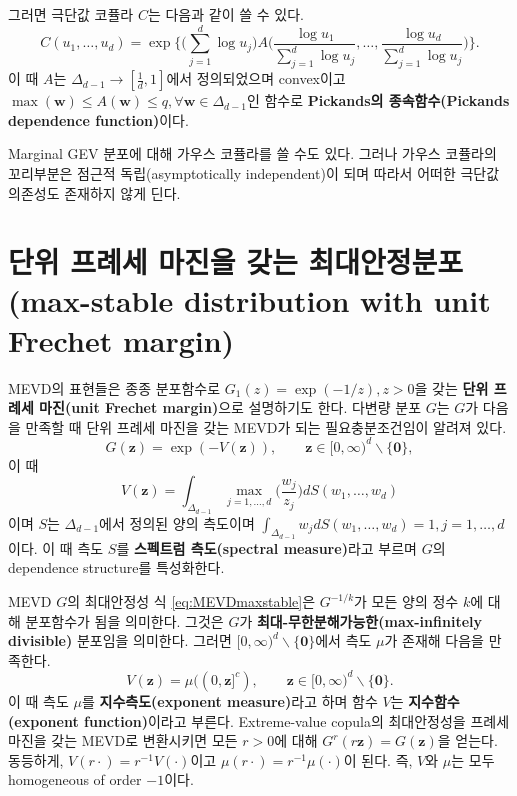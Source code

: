 \documentclass[b5paper,]{scrbook}
\theoremstyle{plain}
\theoremstyle{definition}
\numberwithin{equation}{section}
\begin{document}
그러면 극단값 코퓰라 \(C\)는 다음과 같이 쓸 수 있다.
\[C(u_{1},\ldots, u_{d}) = \exp{\Big\{ \Big( \sum_{j=1}^{d}\log u_{j} \Big)  A \Big( \frac{\log u_{1}}{\sum_{j=1}^{d}\log u_{j}},\ldots,  \frac{\log u_{d}}{\sum_{j=1}^{d}\log u_{j}} \Big) \Big\}}.\]
이 때 \(A\)는 \(\Delta_{d-1}\rightarrow [\frac{1}{d},1]\)에서 정의되었으며 convex이고 \(\max(\mathbf{w})\leq A(\mathbf{w}) \leq q, \forall \mathbf{w} \in \Delta_{d-1}\)인 함수로 \textbf{Pickands의 종속함수(Pickands dependence function)}이다.

Marginal GEV 분포에 대해 가우스 코퓰라를 쓸 수도 있다. 그러나 가우스 코퓰라의 꼬리부분은 점근적 독립(asymptotically independent)이 되며 따라서 어떠한 극단값 의존성도 존재하지 않게 딘다.

\hypertarget{----max-stable-distribution-with-unit-frechet-margin}{%
\section{단위 프례세 마진을 갖는 최대안정분포(max-stable distribution with unit Frechet margin)}\label{----max-stable-distribution-with-unit-frechet-margin}}

MEVD의 표현들은 종종 분포함수로 \(G_{1}(z) = \exp(-1/z), z>0\)을 갖는 \textbf{단위 프례세 마진(unit Frechet margin)}으로 설명하기도 한다. 다변량 분포 \(G\)는 \(G\)가 다음을 만족할 때 단위 프례세 마진을 갖는 MEVD가 되는 필요충분조건임이 알려져 있다.
\[G(\mathbf{z})=\exp(-V(\mathbf{z})), \qquad{\mathbf{z}\in[0,\infty)^{d}\backslash \{\mathbf{0}\}},\]
이 때
\[V(\mathbf{z})=\int_{\Delta_{d-1}}\max_{j=1,\ldots,d}\Big(\frac{w_{j}}{z_{j}}\Big) dS(w_{1},\ldots, w_{d})\]
이며 \(S\)는 \(\Delta_{d-1}\)에서 정의된 양의 측도이며 \(\int_{\Delta_{d-1}}w_{j}dS(w_{1},\ldots, w_{d})=1, j=1,\ldots, d\)이다. 이 때 측도 \(S\)를 \textbf{스펙트럼 측도(spectral measure)}라고 부르며 \(G\)의 dependence structure를 특성화한다.

MEVD \(G\)의 최대안정성 식 \eqref{eq:MEVDmaxstable}은 \(G^{-1/k}\)가 모든 양의 정수 \(k\)에 대해 분포함수가 됨을 의미한다. 그것은 \(G\)가 \textbf{최대-무한분해가능한(max-infinitely divisible)} 분포임을 의미한다. 그러면 \([0,\infty)^{d}\backslash\{\mathbf{0}\}\)에서 측도 \(\mu\)가 존재해 다음을 만족한다.
\[V(\mathbf{z})=\mu((0,\mathbf{z}]^{c}), \qquad{\mathbf{z}\in [0,\infty)^{d}\backslash \{\mathbf{0}\}.}\]
이 때 측도 \(\mu\)를 \textbf{지수측도(exponent measure)}라고 하며 함수 \(V\)는 \textbf{지수함수(exponent function)}이라고 부른다. Extreme-value copula의 최대안정성을 프례세 마진을 갖는 MEVD로 변환시키면 모든 \(r>0\)에 대해 \(G^{r}(r\mathbf{z})=G(\mathbf{z})\)을 얻는다. 동등하게, \(V(r\cdot)=r^{-1}V(\cdot)\)이고 \(\mu(r\cdot)=r^{-1}\mu(\cdot)\)이 된다. 즉, \(V\)와 \(\mu\)는 모두 homogeneous of order \(-1\)이다.
\end{document}
